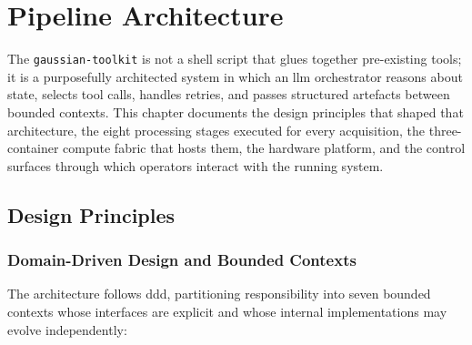 
\chapter{Pipeline Architecture}\label{ch:pipeline}

The \texttt{gaussian-toolkit} is not a shell script that glues together pre-existing tools;
it is a purposefully architected system in which an \acrshort{llm} orchestrator reasons
about state, selects tool calls, handles retries, and passes structured artefacts between
bounded contexts. This chapter documents the design principles that shaped that architecture,
the eight processing stages executed for every acquisition, the three-container compute
fabric that hosts them, the hardware platform, and the control surfaces through which
operators interact with the running system.

\section{Design Principles}\label{sec:design-principles}

\subsection{Domain-Driven Design and Bounded Contexts}

The architecture follows \acrfull{ddd}, partitioning responsibility into seven
bounded contexts whose interfaces are explicit and whose internal implementations
may evolve independently:


